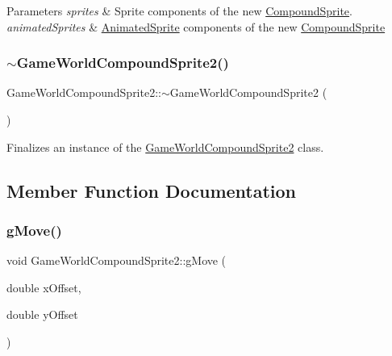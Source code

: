\begin{DoxyParams}{Parameters}
{\em sprites} & Sprite components of the new \hyperlink{class_compound_sprite}{Compound\+Sprite}.\\
\hline
{\em animated\+Sprites} & \hyperlink{class_animated_sprite}{Animated\+Sprite} components of the new \hyperlink{class_compound_sprite}{Compound\+Sprite}\\
\hline
\end{DoxyParams}
\mbox{\label{class_game_world_compound_sprite2_ab1a2a138336d0046521df6693cf88db5}} 
\subsubsection{\texorpdfstring{$\sim$\+Game\+World\+Compound\+Sprite2()}{~GameWorldCompoundSprite2()}}
{\footnotesize\ttfamily Game\+World\+Compound\+Sprite2\+::$\sim$\+Game\+World\+Compound\+Sprite2 (\begin{DoxyParamCaption}{ }\end{DoxyParamCaption})\hspace{0.3cm}{\ttfamily [virtual]}}



Finalizes an instance of the \hyperlink{class_game_world_compound_sprite2}{Game\+World\+Compound\+Sprite2} class. 



\subsection{Member Function Documentation}
\mbox{\label{class_game_world_compound_sprite2_aa45dc19c6010d86e90832f129dd1e327}} 
\subsubsection{\texorpdfstring{g\+Move()}{gMove()}}
{\footnotesize\ttfamily void Game\+World\+Compound\+Sprite2\+::g\+Move (\begin{DoxyParamCaption}\item[{double}]{x\+Offset,  }\item[{double}]{y\+Offset }\end{DoxyParamCaption})\hspace{0.3cm}{\ttfamily [virtual]}}



